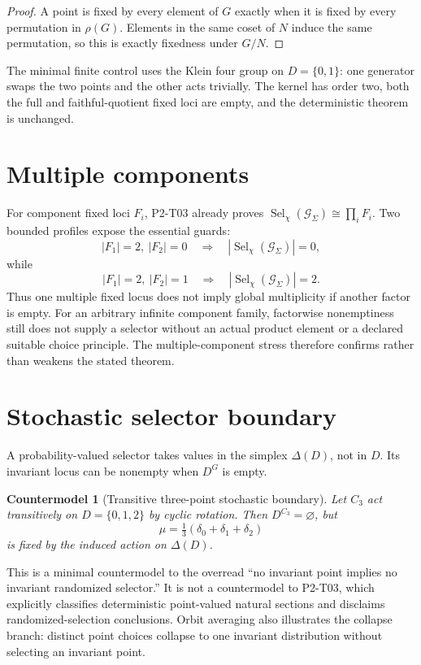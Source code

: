 \documentclass[11pt]{article}
\newtheorem{countermodel}{Countermodel}
\newcommand{\Sel}{\operatorname{Sel}_{\chi}}
\newcommand{\G}{\mathcal G_{\Sigma}}
\begin{document}
\begin{proof}
A point is fixed by every element of \(G\) exactly when it is fixed by every
permutation in \(\rho(G)\). Elements in the same coset of \(N\) induce the
same permutation, so this is exactly fixedness under \(G/N\).
\end{proof}

The minimal finite control uses the Klein four group on \(D=\{0,1\}\):
one generator swaps the two points and the other acts trivially. The kernel
has order two, both the full and faithful-quotient fixed loci are empty, and
the deterministic theorem is unchanged.

\section{Multiple components}

For component fixed loci \(F_i\), P2-T03 already proves
\(\Sel(\G)\cong\prod_iF_i\). Two bounded profiles expose the essential
guards:
\[
  |F_1|=2,\ |F_2|=0\quad\Longrightarrow\quad|\Sel(\G)|=0,
\]
while
\[
  |F_1|=2,\ |F_2|=1\quad\Longrightarrow\quad|\Sel(\G)|=2.
\]
Thus one multiple fixed locus does not imply global multiplicity if another
factor is empty. For an arbitrary infinite component family, factorwise
nonemptiness still does not supply a selector without an actual product
element or a declared suitable choice principle. The multiple-component
stress therefore confirms rather than weakens the stated theorem.

\section{Stochastic selector boundary}

A probability-valued selector takes values in the simplex \(\Delta(D)\),
not in \(D\). Its invariant locus can be nonempty when \(D^G\) is empty.

\begin{countermodel}[Transitive three-point stochastic boundary]
Let \(C_3\) act transitively on \(D=\{0,1,2\}\) by cyclic rotation. Then
\(D^{C_3}=\varnothing\), but
\[
  \mu=\tfrac13(\delta_0+\delta_1+\delta_2)
\]
is fixed by the induced action on \(\Delta(D)\).
\end{countermodel}

This is a minimal countermodel to the overread ``no invariant point implies
no invariant randomized selector.'' It is not a countermodel to P2-T03,
which explicitly classifies deterministic point-valued natural sections and
disclaims randomized-selection conclusions. Orbit averaging also illustrates
the collapse branch: distinct point choices collapse to one invariant
distribution without selecting an invariant point.
\end{document}
